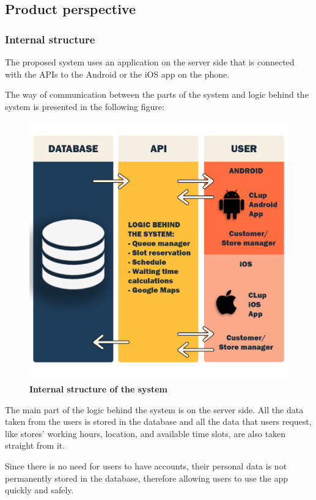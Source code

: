 
\subsection{Product perspective}
\subsubsection{Internal structure}
\hspace{\parindent}The proposed system uses an application on the server side that is connected with the APIs to the Android or the iOS app on the phone.

The way of communication between the parts of the system and logic behind the system is presented in the following figure:
\begin{figure}[!htb]
\centering
\includegraphics[width=\textwidth]{Images/DB_API_USER.png}
\caption{\label{fig:dbapiuser}\textbf{Internal structure of the system}}
\end{figure}
\newpage

The main part of the logic behind the system is on the server side. All the data taken from the users is stored in the database and all the data that users request, like stores' working hours, location, and available time slots, are also taken straight from it.

Since there is no need for users to have accounts, their personal data is not permanently stored in the database, therefore allowing users to use the app quickly and safely.

